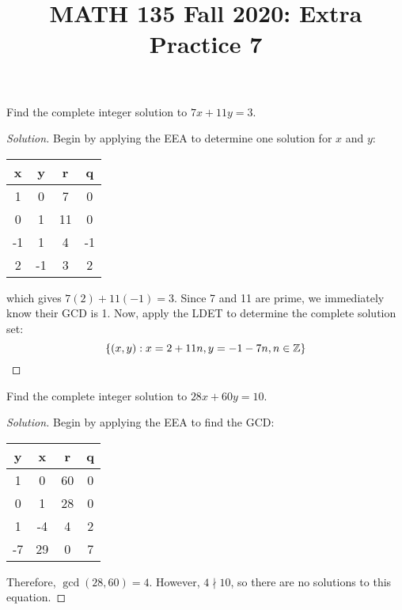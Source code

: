 \documentclass{agony}
\title{MATH 135 Fall 2020: Extra Practice 7}
\begin{document}
\thispagestyle{firstpage}

\textbf{\thetitle}


\question Find the complete integer solution to $7x+11y=3$.
\begin{proof}[Solution]
  Begin by applying the EEA to determine one solution for $x$ and $y$:
  \begin{center}
    \begin{tabular}{C|C|C|C}
      x  & y  & r  & q  \\   & 0  & 7  & 0  \\
      0  & 1  & 11 & 0  \\
      -1 & 1  & 4  & -1 \\
      2  & -1 & 3  & 2
    \end{tabular}
  \end{center}
  which gives $7(2)+11(-1)=3$.
  Since 7 and 11 are prime, we immediately know their GCD is 1.
  Now, apply the LDET to determine the complete solution set:
  \begin{equation*}
    \{ (x,y) : x = 2 + 11n, y = -1 - 7n, n\in\mathbb{Z} \} \qedhere
  \end{equation*}
\end{proof}


\question Find the complete integer solution to $28x+60y=10$.
\begin{proof}[Solution]
  Begin by applying the EEA to find the GCD\@:
  \begin{center}
    \begin{tabular}{C|C|C|C}
      y  & x  & r  & q \\   & 0  & 60 & 0 \\
      0  & 1  & 28 & 0 \\
      1  & -4 & 4  & 2 \\
      -7 & 29 & 0  & 7
    \end{tabular}
  \end{center}
  Therefore, $\gcd(28,60)=4$.
  However, $4 \nmid 10$, so there are no solutions to this equation.
\end{proof}


\end{document}
